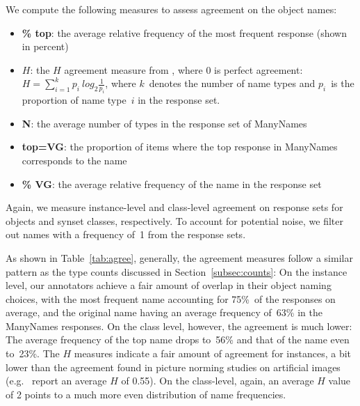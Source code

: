 We compute the following measures to assess agreement on the object names:
\begin{itemize}
\item \textbf{\% top}: the average relative frequency of the most frequent response (shown in percent)
\item \textbf{$H$}: the $H$ agreement measure from \citet{snodgrass}, where 0 is perfect agreement: \mbox{$H = \sum_{i=1}^k p_i~log_2\frac{1}{p_i}$}, 
where $k$\ denotes the number of name types and $p_i$\ is the proportion of name type\ $i$ in the response set. 


\item \textbf{N}: the average number of types in the response set of ManyNames
\item \textbf{top=VG}: the proportion of items where the top response in ManyNames corresponds to the \vg name 
\item \textbf{\% VG}: the average relative frequency of the \vg name in the response set 
\end{itemize}
Again, we measure instance-level and class-level agreement on response sets for objects and synset classes, respectively.
To account for potential noise, we filter out names with a frequency of\ 1 from the response sets.

As shown in Table\ \ref{tab:agree}, generally, the agreement measures follow a similar pattern as the type counts discussed in Section\ \ref{subsec:counts}:
On the instance level, our annotators achieve a fair amount of overlap in their object naming choices, with the most frequent name accounting for 75\%\ of the responses on average, and the original \vg name having an average frequency of\ 63\% in the ManyNames responses. On the class level, however, the agreement is much lower: The average frequency of the top name drops to\ 56\% and that of the \vg name even to\ 23\%. The $H$ measures indicate a fair amount of agreement for instances, a bit lower than the agreement found in picture norming studies on artificial images (e.g.\  report an average $H$ of 0.55). On the class-level, again, an average $H$ value of 2 points to a much more even distribution of name frequencies.

